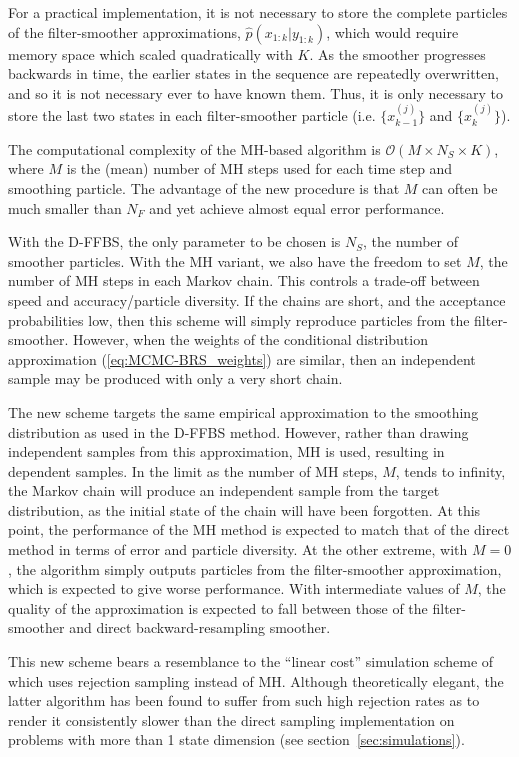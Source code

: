 \documentclass[10pt,twocolumn,twoside]{IEEEtran}
\begin{document}
For a practical implementation, it is not necessary to store the complete particles of the filter-smoother approximations, $\hat{p}(x_{1:k}|y_{1:k})$, which would require memory space which scaled quadratically with $K$. As the smoother progresses backwards in time, the earlier states in the sequence are repeatedly overwritten, and so it is not necessary ever to have known them. Thus, it is only necessary to store the last two states in each filter-smoother particle (i.e. $\{x_{k-1}^{(j)}\}$ and $\{x_{k}^{(j)}\}$).

The computational complexity of the MH-based algorithm is $\mathcal{O}(M \times N_S \times K)$, where $M$ is the (mean) number of MH steps used for each time step and smoothing particle. The advantage of the new procedure is that $M$ can often be much smaller than $N_F$ and yet achieve almost equal error performance.

With the D-FFBS, the only parameter to be chosen is $N_S$, the number of smoother particles. With the MH variant, we also have the freedom to set $M$, the number of MH steps in each Markov chain. This controls a trade-off between speed and accuracy/particle diversity. If the chains are short, and the acceptance probabilities low, then this scheme will simply reproduce particles from the filter-smoother. However, when the weights of the conditional distribution approximation (\ref{eq:MCMC-BRS_weights}) are similar, then an independent sample may be produced with only a very short chain.

The new scheme targets the same empirical approximation to the smoothing distribution as used in the D-FFBS method. However, rather than drawing independent samples from this approximation, MH is used, resulting in dependent samples.  In the limit as the number of MH steps, $M$, tends to infinity, the Markov chain will produce an independent sample from the target distribution, as the initial state of the chain will have been forgotten. At this point, the performance of the MH method is expected to match that of the direct method in terms of error and particle diversity. At the other extreme, with $M=0$, the algorithm simply outputs particles from the filter-smoother approximation, which is expected to give worse performance. With intermediate values of $M$, the quality of the approximation is expected to fall between those of the filter-smoother and direct backward-resampling smoother.

This new scheme bears a resemblance to the ``linear cost'' simulation scheme of \cite{Douc2009} which uses rejection sampling instead of MH. Although theoretically elegant, the latter algorithm has been found to suffer from such high rejection rates as to render it consistently slower than the direct sampling implementation on problems with more than 1 state dimension (see section~\ref{sec:simulations}).
\end{document}
